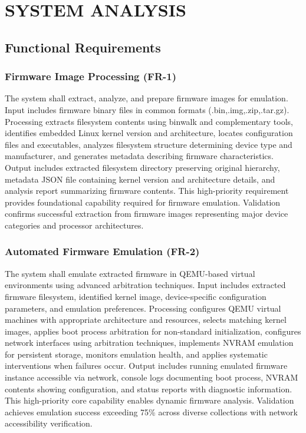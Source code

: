 \chapter{SYSTEM ANALYSIS}

\section{Functional Requirements}

\subsection{Firmware Image Processing (FR-1)}

The system shall extract, analyze, and prepare firmware images for emulation. Input includes firmware binary files in common formats (.bin,.img,.zip,.tar.gz). Processing extracts filesystem contents using binwalk and complementary tools, identifies embedded Linux kernel version and architecture, locates configuration files and executables, analyzes filesystem structure determining device type and manufacturer, and generates metadata describing firmware characteristics. Output includes extracted filesystem directory preserving original hierarchy, metadata JSON file containing kernel version and architecture details, and analysis report summarizing firmware contents. This high-priority requirement provides foundational capability required for firmware emulation. Validation confirms successful extraction from firmware images representing major device categories and processor architectures.

\subsection{Automated Firmware Emulation (FR-2)}

The system shall emulate extracted firmware in QEMU-based virtual environments using advanced arbitration techniques. Input includes extracted firmware filesystem, identified kernel image, device-specific configuration parameters, and emulation preferences. Processing configures QEMU virtual machines with appropriate architecture and resources, selects matching kernel images, applies boot process arbitration for non-standard initialization, configures network interfaces using arbitration techniques, implements NVRAM emulation for persistent storage, monitors emulation health, and applies systematic interventions when failures occur. Output includes running emulated firmware instance accessible via network, console logs documenting boot process, NVRAM contents showing configuration, and status reports with diagnostic information. This high-priority core capability enables dynamic firmware analysis. Validation achieves emulation success exceeding 75\% across diverse collections with network accessibility verification.

